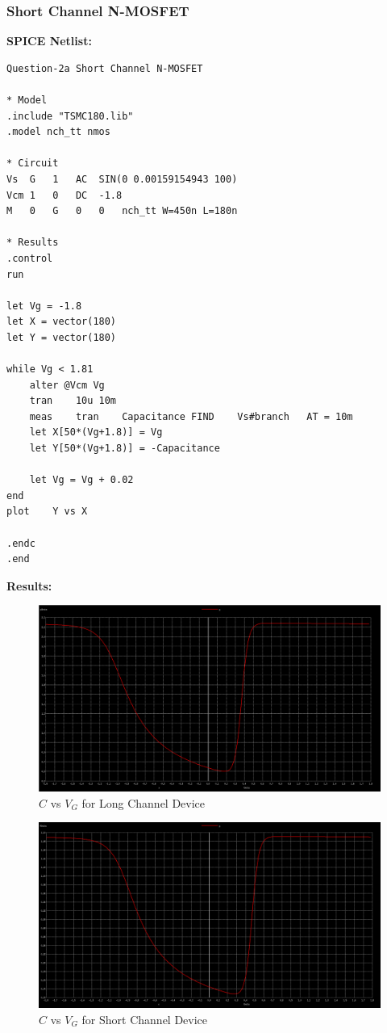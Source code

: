 \documentclass{article}
\begin{document}
\subsubsection{Short Channel N-MOSFET}
\textbf{SPICE Netlist:}
\begin{lstlisting}
Question-2a Short Channel N-MOSFET

* Model
.include "TSMC180.lib"
.model nch_tt nmos

* Circuit
Vs	G	1	AC	SIN(0 0.00159154943 100)
Vcm	1	0	DC	-1.8
M	0	G	0	0	nch_tt W=450n L=180n

* Results
.control
run

let Vg = -1.8
let X = vector(180)
let Y = vector(180)

while Vg < 1.81
	alter @Vcm Vg
	tran	10u	10m
	meas	tran	Capacitance	FIND	Vs#branch	AT = 10m
	let X[50*(Vg+1.8)] = Vg
	let Y[50*(Vg+1.8)] = -Capacitance

	let Vg = Vg + 0.02
end
plot	Y vs X

.endc
.end
\end{lstlisting}
\textbf{Results:}
\begin{figure}[!ht]
    \centering
    \includegraphics[scale=0.25]{Images/2along.png}
    \caption{$C$ vs $V_G$ for Long Channel Device}
\end{figure}
\begin{figure}[!ht]
    \centering
    \includegraphics[scale=0.25]{Images/2ashort.png}
    \caption{$C$ vs $V_G$ for Short Channel Device}
\end{figure}
\end{document}
